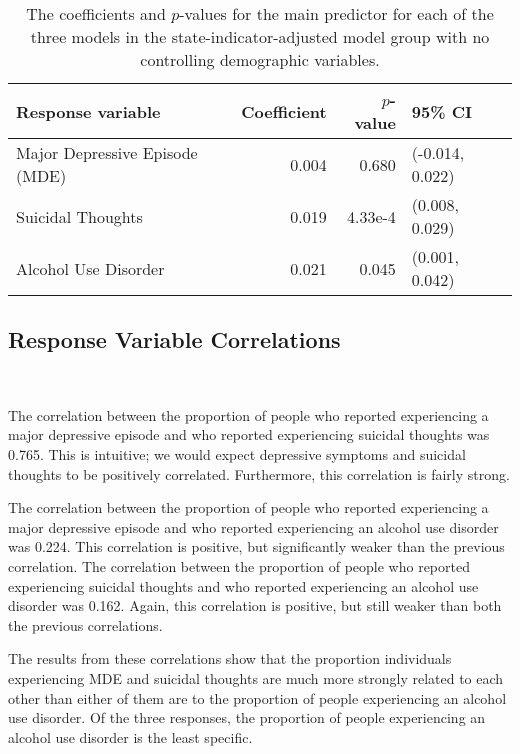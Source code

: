 \documentclass{article}
\begin{document}
\begin{table}[!htb]
\begin{center}
\begin{tabular}{l r r l}
    \toprule
    Response variable & Coefficient & $p$-value & 95\% CI\\
    \midrule
    Major Depressive Episode (MDE) & 0.004 & 0.680 & (-0.014, 0.022)\\
    Suicidal Thoughts & 0.019 & 4.33e-4 & (0.008, 0.029)\\
    Alcohol Use Disorder & 0.021 & 0.045 & (0.001, 0.042)\\
    \bottomrule
\end{tabular}
\caption{\label{tab:state-ind-only-model-results} The coefficients and $p$-values
    for the main predictor for each of the three models
    in the state-indicator-adjusted model group with no controlling demographic variables.
}
\end{center}
\end{table}

\subsection{Response Variable Correlations}~\label{sec:results-corr}

The correlation between the proportion of people who reported experiencing
a major depressive episode and
who reported experiencing suicidal thoughts was
0.765.
This is intuitive; we would expect depressive symptoms and suicidal thoughts
to be positively correlated.
Furthermore, this correlation is fairly strong.

The correlation between the proportion of people who reported experiencing
a major depressive episode and
who reported experiencing an alcohol use disorder was
0.224.
This correlation is positive, but significantly weaker than
the previous correlation.
The correlation between the proportion of people who reported experiencing
suicidal thoughts and
who reported experiencing an alcohol use disorder was
0.162.
Again, this correlation is positive, but still weaker than
both the previous correlations.

The results from these correlations show that the proportion individuals
experiencing MDE and suicidal thoughts are much more strongly related to each
other than either of them are to the proportion of people experiencing
an alcohol use disorder.
Of the three responses, the proportion of people experiencing an
alcohol use disorder is the least specific.
\end{document}
